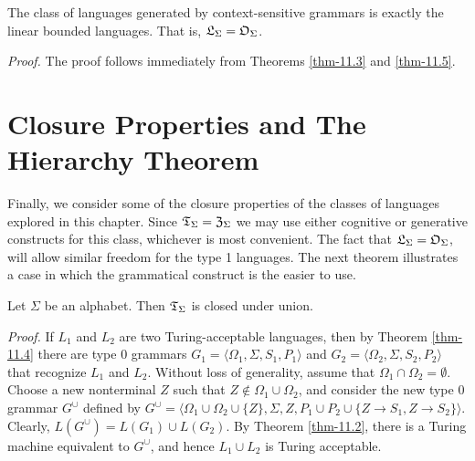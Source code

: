 \begin{cor}\label{cor-11.2}
The class of languages generated by context-sensitive grammars is exactly the
linear bounded languages. That is, $\mathfrak{L}_\Sigma=\mathfrak{O}_\Sigma$.

\emph{Proof.} The proof follows immediately from Theorems \ref{thm-11.3} and \ref{thm-11.5}.
\end{cor}

\section{Closure Properties and The Hierarchy Theorem}\label{sec-11.4}

Finally, we consider some of the closure properties of the classes of languages
explored in this chapter. Since $\mathfrak{T}_\Sigma=\mathfrak{Z}_\Sigma$ we may use either cognitive or
generative constructs for this class, whichever is most convenient. The fact
that $\mathfrak{L}_\Sigma=\mathfrak{O}_\Sigma$, will allow similar freedom for the type 1 languages. The
next theorem illustrates a case in which the grammatical construct is the
easier to use.

\begin{thm}\label{thm-11.6}
Let $\Sigma$ be an alphabet. Then $\mathfrak{T}_\Sigma$ is closed under union.

\emph{Proof.} If $L_1$ and $L_2$ are two Turing-acceptable languages, then by
Theorem \ref{thm-11.4} there are type 0 grammars $G_1=\langle\Omega_1,\Sigma,S_1,P_1
\rangle$ and $G_2=\langle\Omega_2,\Sigma,S_2,P_2\rangle$ that recognize $L_1$
and $L_2$. Without loss of generality, assume that $\Omega_1\cap\Omega_2=
\emptyset$. Choose a new nonterminal $Z$ such that $Z\not \in\Omega_1\cup\Omega_2$,
and consider the new type 0 grammar $G^{\cup}$ defined by $G^{\cup}=\langle
\Omega_1\cup\Omega_2\cup\{Z\},\Sigma,Z,P_1\cup P_2\cup\{Z\rightarrow S_1,Z
\rightarrow S_2\}\rangle$. Clearly, $L(G^{\cup})=L(G_1)\cup L(G_2)$. By Theorem
\ref{thm-11.2}, there is a Turing machine equivalent to $G^{\cup}$, and hence $L_1\cup
L_2$ is Turing acceptable.
\end{thm}

